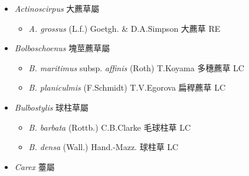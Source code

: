 
  \begin{itemize}
 \item[] \textit{Actinoscirpus} 大藨草屬
                                
  \begin{itemize}
        \item[] \textit{A. grossus} (L.f.) Goetgh. \& D.A.Simpson  大藨草   RE
  \end{itemize}
 \item[] \textit{Bolboschoenus} 塊莖藨草屬
                                
  \begin{itemize}
        \item[] \textit{B. maritimus} subsp. \textit{affinis} (Roth) T.Koyama  多穗藨草   LC
        \item[] \textit{B. planiculmis} (F.Schmidt) T.V.Egorova  扁稈藨草   LC
  \end{itemize}
 \item[] \textit{Bulbostylis} 球柱草屬
                                
  \begin{itemize}
        \item[] \textit{B. barbata} (Rottb.) C.B.Clarke  毛球柱草   LC
        \item[] \textit{B. densa} (Wall.) Hand.-Mazz.  球柱草   LC
  \end{itemize}
 \item[] \textit{Carex} 薹屬
                                

\end{itemize}
